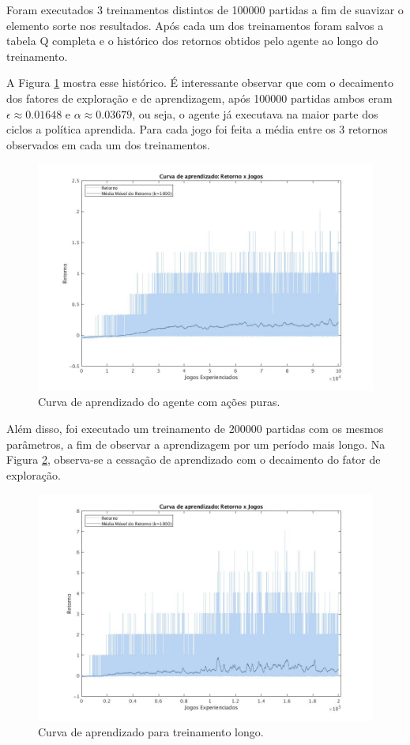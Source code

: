 Foram executados 3 treinamentos distintos de 100000 partidas a fim de suavizar o elemento sorte nos resultados. Após cada um dos treinamentos foram salvos a tabela Q completa e o histórico dos retornos obtidos pelo agente ao longo do treinamento.

A Figura \ref{fig:single-agent-curva} mostra esse histórico. É interessante observar que com o decaimento dos fatores de exploração e de aprendizagem, após 100000 partidas ambos eram $\epsilon \approx 0.01648$ e $\alpha \approx 0.03679$, ou seja, o agente já executava na maior parte dos ciclos a política aprendida. Para cada jogo foi feita a média entre os 3 retornos observados em cada um dos treinamentos.

\begin{figure}[H]
	\includegraphics[width=0.9\linewidth]{figs/curva-qtabular.jpg}
	\centering
	\caption{Curva de aprendizado do agente com ações puras. }
	\label{fig:single-agent-curva}
\end{figure}

Além disso, foi executado um treinamento de 200000 partidas com os mesmos parâmetros, a fim de observar a aprendizagem por um período mais longo. Na Figura \ref{fig:single-agent-curvalonga}, observa-se a cessação de aprendizado com o decaimento do fator de exploração.

\begin{figure}[H]
	\includegraphics[width=0.9\linewidth]{figs/curvalonga-qtabular.jpg}
	\centering
	\caption{Curva de aprendizado para treinamento longo.}
	\label{fig:single-agent-curvalonga}
\end{figure}

